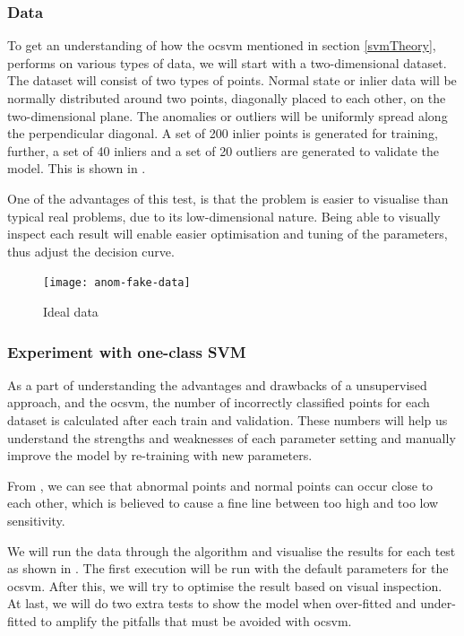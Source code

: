 \documentclass[english, a4paper]{report}
\begin{document}
{{{            \subsubsection{Data}
            {
                To get an understanding of how the \gls{ocsvm} mentioned in section \ref{svmTheory}, performs on various types of data, we will start with a two-dimensional dataset. The dataset will consist of two types of points. Normal state or inlier data will be normally distributed around two points, diagonally placed to each other, on the two-dimensional plane. The anomalies or outliers will be uniformly spread along the perpendicular diagonal. A set of 200 inlier points is generated for training, further, a set of 40 inliers and a set of 20 outliers are generated to validate the model. This is shown in .
                \par
                One of the advantages of this test, is that the problem is easier to visualise than typical real problems, due to its low-dimensional nature. Being able to visually inspect each result will enable easier optimisation and tuning of the parameters, thus adjust the decision curve. 
                
                \begin{figure}[H]
                    \centering \texttt{[image: anom-fake-data]}
                    \caption{Ideal data}
                    \label{fig:fakeDataAD}
                \end{figure}
            }
            
            \subsubsection{Experiment with one-class SVM}
            {
                As a part of understanding the advantages and drawbacks of a unsupervised approach, and the \gls{ocsvm}, the number of incorrectly classified points for each dataset is calculated after each train and validation. These numbers will help us understand the strengths and weaknesses of each parameter setting and manually improve the model by re-training with new parameters.
                \par
                From , we can see that abnormal points and normal points can occur close to each other, which is believed to cause a fine line between too high and too low sensitivity.
                \par
                We will run the data through the algorithm and visualise the results for each test as shown in . The first execution will be run with the default parameters for the \gls{ocsvm}. After this, we will try to optimise the result based on visual inspection. At last, we will do two extra tests to show the model when over-fitted and under-fitted to amplify the pitfalls that must be avoided with \gls{ocsvm}.
                
}}}}
\end{document}
